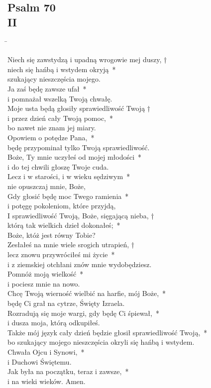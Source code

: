 \subsection*{Psalm 70\\II}
\begin{tabbing}
\hspace{4mm} \= \>\kill

Niech się zawstydzą i upadną wrogowie mej duszy, †\\
niech się hańbą i wstydem okryją~*\\
szukający nieszczęścia mojego.\\
\>Ja zaś będę zawsze ufał~*\\
\>i pomnażał wszelką Twoją chwałę.\\
Moje usta będą głosiły sprawiedliwość Twoją †\\
i przez dzień cały Twoją pomoc,~*\\
bo nawet nie znam jej miary.\\
\>Opowiem o potędze Pana,~*\\
\>będę przypominał tylko Twoją sprawiedliwość.\\
Boże, Ty mnie uczyłeś od mojej młodości~*\\
i do tej chwili głoszę Twoje cuda.\\
\>Lecz i w starości, i w wieku sędziwym~*\\
\>nie opuszczaj mnie, Boże,\\
Gdy głosić będę moc Twego ramienia~*\\
i potęgę pokoleniom, które przyjdą,\\
\>I sprawiedliwość Twoją, Boże, sięgającą nieba, †\\
\>którą tak wielkich dzieł dokonałeś;~*\\
\>Boże, któż jest równy Tobie?\\
Zesłałeś na mnie wiele srogich utrapień, †\\
lecz znowu przywróciłeś mi życie~*\\
i z ziemskiej otchłani znów mnie wydobędziesz.\\
\>Pomnóż moją wielkość~*\\
\>i pociesz mnie na nowo.\\
Chcę Twoją wierność wielbić na harfie, mój Boże,~*\\
będę Ci grał na cytrze, Święty Izraela.\\
\>Rozradują się moje wargi, gdy będę Ci śpiewał,~*\\
\>i dusza moja, którą odkupiłeś.\\
Także mój język cały dzień będzie głosił sprawiedliwość Twoją,~*\\
bo szukający mojego nieszczęścia okryli się hańbą i wstydem.\\
\>Chwała Ojcu i Synowi,~*\\
\>i Duchowi Świętemu.\\
Jak była na początku, teraz i zawsze,~*\\
i na wieki wieków. Amen.
\end{tabbing}